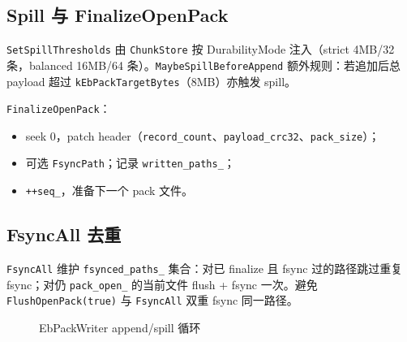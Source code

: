 \subsection{Spill 与 FinalizeOpenPack}

\texttt{SetSpillThresholds} 由 \texttt{ChunkStore} 按 DurabilityMode 注入（strict 4MB/32 条，balanced 16MB/64 条）。\texttt{MaybeSpillBeforeAppend} 额外规则：若追加后总 payload 超过 \texttt{kEbPackTargetBytes}（8MB）亦触发 spill。

\texttt{FinalizeOpenPack}：
\begin{itemize}[nosep]
  \item seek 0，patch header（\texttt{record\_count}、\texttt{payload\_crc32}、\texttt{pack\_size}）；
  \item 可选 \texttt{FsyncPath}；记录 \texttt{written\_paths\_}；
  \item \texttt{++seq\_}，准备下一个 pack 文件。
\end{itemize}

\subsection{FsyncAll 去重}

\texttt{FsyncAll} 维护 \texttt{fsynced\_paths\_} 集合：对已 finalize 且 fsync 过的路径跳过重复 fsync；对仍 \texttt{pack\_open\_} 的当前文件 flush + fsync 一次。避免 \texttt{FlushOpenPack(true)} 与 \texttt{FsyncAll} 双重 fsync 同一路径。

\begin{figure}[htbp]
\centering
{}
\caption{EbPackWriter append/spill 循环}
\label{fig:ebpack-spill}
\end{figure}

